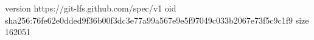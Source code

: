 version https://git-lfs.github.com/spec/v1
oid sha256:76fe62e0dded9f36b00f3dc3e77a99a567e9e5f97049c033b2067e73f5c9c1f9
size 162051
